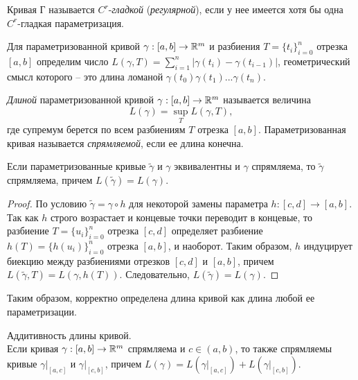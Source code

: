     \begin{definition}
        Кривая Г называется $C^{r}$-\textit{гладкой} (\textit{регулярной}), если у нее имеется хотя бы одна $C^{r}$-гладкая параметризация.
    \end{definition}
    
    Для параметризованной кривой $\gamma: [a, b] \to \mathbb{R}^m$ и разбиения $T = \{t_{i}\}_{i=0}^{n}$ отрезка $[a, b]$ определим число $L(\gamma, T) = \sum_{i=1}^{n} |\gamma(t_{i}) - \gamma(t_{i-1})|$, геометрический смысл которого -- это длина ломаной $\gamma(t_{0})\gamma(t_{1})...\gamma(t_{n})$.
    
    \begin{definition}
        \textit{Длиной} параметризованной кривой $\gamma: [a, b] \to \mathbb{R}^m$ называется величина 
        \[L(\gamma) = \sup_{T}L(\gamma, T),\]
        где супремум берется по всем разбиениям $T$ отрезка $[a ,b]$. Параметризованная кривая называется \textit{спрямляемой}, если ее длина конечна.
    \end{definition}
    
    \begin{lemma}
        Если параметризованные кривые $\tilde\gamma$ и $\gamma$ эквивалентны и $\gamma$ спрямляема, то $\tilde\gamma$ спрямляема, причем $L(\tilde\gamma) = L(\gamma)$.
    \end{lemma}
    
    \begin{proof}
        По условию $\tilde\gamma = \gamma \circ h$ для некоторой замены параметра $h: [c, d] \to [a, b]$. Так как $h$ строго возрастает и концевые точки переводит в концевые, то разбиение $T = \{u_{i}\}_{i = 0}^{n}$ отрезка $[c, d]$ определяет разбиение $h(T) = \{h(u_{i})\}_{i = 0}^{n}$ отрезка $[a, b]$, и наоборот. Таким образом, $h$ индуцирует биекцию между разбиениями отрезков $[c, d]$ и $[a, b]$, причем $L(\tilde\gamma, T) = L(\gamma, h(T))$. Следовательно, $L(\tilde\gamma) = L(\gamma)$.
    \end{proof}
    
    \begin{note}
        Таким образом, корректно определена длина кривой как длина любой ее параметризации.
    \end{note}
    
    \begin{lemma}{Аддитивность длины кривой.}\\
        Если кривая $\gamma: [a, b] \to \mathbb{R}^m$ спрямляема и $c \in (a, b)$, то также спрямляемы кривые $\gamma|_{[a, c]}$ и $\gamma|_{[c, b]}$, причем $L(\gamma) = L(\gamma|_{[a, c]}) + L(\gamma|_{[c, b]})$.
    \end{lemma}
    
